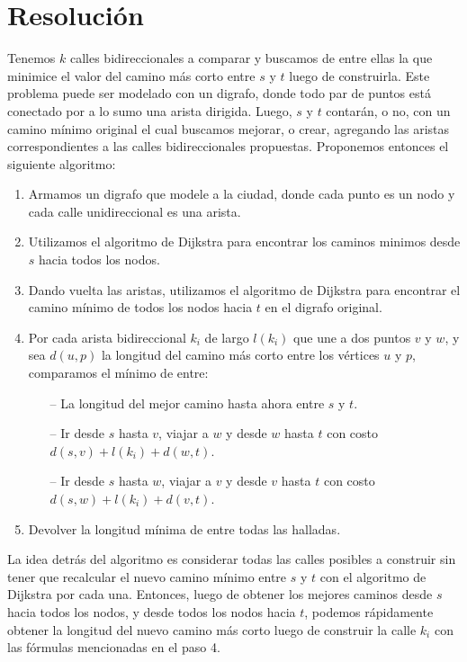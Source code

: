 \section{Resolución}

Tenemos $k$ calles bidireccionales a comparar y buscamos de entre ellas la que minimice el valor del camino más corto entre $s$ y $t$ luego de construirla. Este problema puede ser modelado con un digrafo, donde todo par de puntos está conectado por a lo sumo una arista dirigida. Luego, $s$ y $t$ contarán, o no, con un camino mínimo original el cual buscamos mejorar, o crear, agregando las aristas correspondientes a las calles bidireccionales propuestas. Proponemos entonces el siguiente algoritmo:

\begin{enumerate}
    \item Armamos un digrafo que modele a la ciudad, donde cada punto es un nodo y cada calle unidireccional es una arista. 
    \item Utilizamos el algoritmo de Dijkstra para encontrar los caminos minimos desde $s$ hacia todos los nodos.
    \item Dando vuelta las aristas, utilizamos el algoritmo de Dijkstra para encontrar el camino mínimo de todos los nodos hacia $t$ en el digrafo original.
    \item Por cada arista bidireccional $k_i$ de largo $l(k_i)$ que une a dos puntos $v$ y $w$, y sea $d(u,p)$ la longitud del camino más corto entre los vértices $u$ y $p$, comparamos el mínimo de entre: 
    \begin{itemize}
        \item[--] La longitud del mejor camino hasta ahora entre $s$ y $t$.
        \item[--] Ir desde $s$ hasta $v$, viajar a $w$ y desde $w$ hasta $t$ con costo $d(s,v) + l(k_i) + d(w,t)$.
        \item[--] Ir desde $s$ hasta $w$, viajar a $v$ y desde $v$ hasta $t$ con costo $d(s,w) + l(k_i) + d(v,t)$.
    \end{itemize}
    \item Devolver la longitud mínima de entre todas las halladas.
\end{enumerate}

La idea detrás del algoritmo es considerar todas las calles posibles a construir sin tener que recalcular el nuevo camino mínimo entre $s$ y $t$ con el algoritmo de Dijkstra por cada una. Entonces, luego de obtener los mejores caminos desde $s$ hacia todos los nodos, y desde todos los nodos hacia $t$, podemos rápidamente obtener la longitud del nuevo camino más corto luego de construir la calle $k_i$ con las fórmulas mencionadas en el paso 4. 


